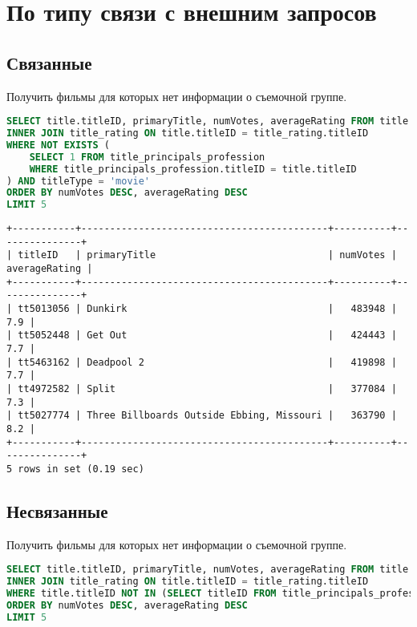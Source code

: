 \documentclass[12pt,a4paper]{article}
\begin{document}
\section{По типу связи с внешним запросов}

\subsection{Связанные}

Получить фильмы для которых нет информации о съемочной группе.

\begin{lstlisting}[language=SQL]
SELECT title.titleID, primaryTitle, numVotes, averageRating FROM title
INNER JOIN title_rating ON title.titleID = title_rating.titleID
WHERE NOT EXISTS (
    SELECT 1 FROM title_principals_profession
    WHERE title_principals_profession.titleID = title.titleID
) AND titleType = 'movie'
ORDER BY numVotes DESC, averageRating DESC
LIMIT 5
\end{lstlisting}

\begin{lstlisting}[basicstyle = \tiny\ttfamily, columns = fixed]
+-----------+-------------------------------------------+----------+---------------+
| titleID   | primaryTitle                              | numVotes | averageRating |
+-----------+-------------------------------------------+----------+---------------+
| tt5013056 | Dunkirk                                   |   483948 |           7.9 |
| tt5052448 | Get Out                                   |   424443 |           7.7 |
| tt5463162 | Deadpool 2                                |   419898 |           7.7 |
| tt4972582 | Split                                     |   377084 |           7.3 |
| tt5027774 | Three Billboards Outside Ebbing, Missouri |   363790 |           8.2 |
+-----------+-------------------------------------------+----------+---------------+
5 rows in set (0.19 sec)
\end{lstlisting}

\subsection{Несвязанные}

Получить фильмы для которых нет информации о съемочной группе.

\begin{lstlisting}[language=SQL]
SELECT title.titleID, primaryTitle, numVotes, averageRating FROM title
INNER JOIN title_rating ON title.titleID = title_rating.titleID
WHERE title.titleID NOT IN (SELECT titleID FROM title_principals_profession) AND titleType = 'movie'
ORDER BY numVotes DESC, averageRating DESC
LIMIT 5
\end{lstlisting}
\end{document}
